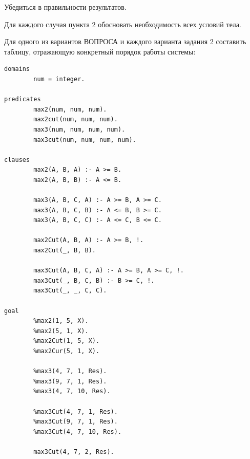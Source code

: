 \documentclass[12pt,a4paper]{scrreprt}
\begin{document}
Убедиться в правильности результатов.

Для каждого случая пункта 2 обосновать необходимость всех условий тела.

Для одного из вариантов ВОПРОСА и каждого варианта задания 2 составить таблицу, отражающую конкретный порядок работы системы:

\begin{lstlisting}
domains
		num = integer.

predicates
		max2(num, num, num).
		max2cut(num, num, num).
		max3(num, num, num, num).
		max3cut(num, num, num, num).

clauses
		max2(A, B, A) :- A >= B.
		max2(A, B, B) :- A <= B.
		
		max3(A, B, C, A) :- A >= B, A >= C.
		max3(A, B, C, B) :- A <= B, B >= C.
		max3(A, B, C, C) :- A <= C, B <= C.
		
		max2Cut(A, B, A) :- A >= B, !.
		max2Cut(_, B, B).
		
		max3Cut(A, B, C, A) :- A >= B, A >= C, !.
		max3Cut(_, B, C, B) :- B >= C, !.
		max3Cut(_, _, C, C).

goal
		%max2(1, 5, X).
		%max2(5, 1, X).
		%max2Cut(1, 5, X).
		%max2Cur(5, 1, X).
		
		%max3(4, 7, 1, Res).
		%max3(9, 7, 1, Res).
		%max3(4, 7, 10, Res).
		
		%max3Cut(4, 7, 1, Res).
		%max3Cut(9, 7, 1, Res).
		%max3Cut(4, 7, 10, Res).
		
		max3Cut(4, 7, 2, Res).
\end{lstlisting}
\end{document}
